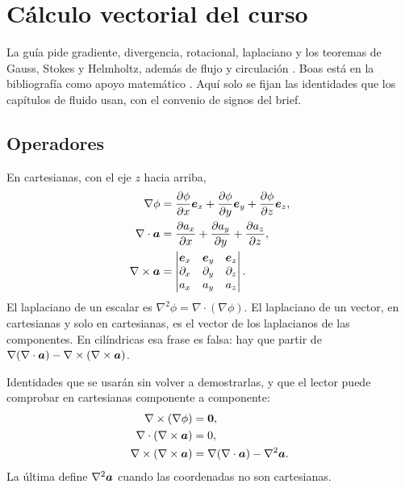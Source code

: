 \chapter{Cálculo vectorial del curso}
\label{ch:vectorial}

La guía pide gradiente, divergencia, rotacional, laplaciano y los teoremas de Gauss, Stokes y Helmholtz, además de flujo y circulación \parencite{uleGuia2026}. Boas está en la bibliografía como apoyo matemático \parencite{boas2006}. Aquí solo se fijan las identidades que los capítulos de fluido usan, con el convenio de signos del brief.

\section{Operadores}

En cartesianas, con el eje \(z\) hacia arriba,
\begin{align}
\nabla\phi&=\frac{\partial\phi}{\partial x}\boldsymbol{e}_x+\frac{\partial\phi}{\partial y}\boldsymbol{e}_y+\frac{\partial\phi}{\partial z}\boldsymbol{e}_z,\\
\nabla\cdot\boldsymbol{a}&=\frac{\partial a_x}{\partial x}+\frac{\partial a_y}{\partial y}+\frac{\partial a_z}{\partial z},\\
\nabla\times\boldsymbol{a}
&=\begin{vmatrix}
\boldsymbol{e}_x&\boldsymbol{e}_y&\boldsymbol{e}_z\\
\partial_x&\partial_y&\partial_z\\
a_x&a_y&a_z
\end{vmatrix}.
\end{align}
El laplaciano de un escalar es \(\nabla^2\phi=\nabla\cdot(\nabla\phi)\). El laplaciano de un vector, en cartesianas y solo en cartesianas, es el vector de los laplacianos de las componentes. En cilíndricas esa frase es falsa: hay que partir de \(\nabla(\nabla\cdot\boldsymbol{a})-\nabla\times(\nabla\times\boldsymbol{a})\).

Identidades que se usarán sin volver a demostrarlas, y que el lector puede comprobar en cartesianas componente a componente:
\begin{align}
\nabla\times(\nabla\phi)&=\boldsymbol{0},\\
\nabla\cdot(\nabla\times\boldsymbol{a})&=0,\\
\label{eq:vector-id}
\nabla\times(\nabla\times\boldsymbol{a})&=\nabla(\nabla\cdot\boldsymbol{a})-\nabla^2\boldsymbol{a}.
\end{align}
La última define \(\nabla^2\boldsymbol{a}\) cuando las coordenadas no son cartesianas.

